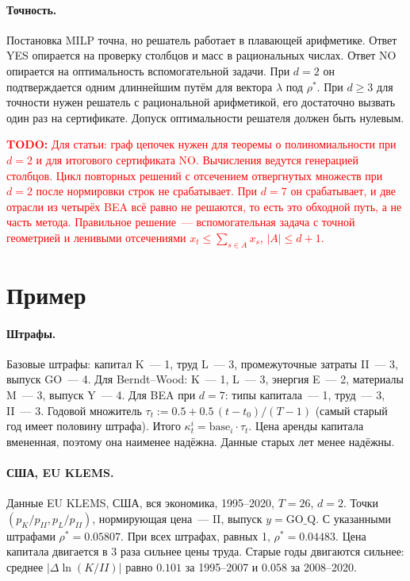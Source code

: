 \documentclass[a4paper,11pt]{article}
\theoremstyle{plain}
\theoremstyle{definition}
\theoremstyle{remark}
\newcommand{\abs}[1]{\left\lvert #1 \right\rvert}
\newcommand{\todo}[1]{\textcolor{red}{\textbf{TODO:} #1}}
\begin{document}
\paragraph{Точность.} Постановка MILP точна, но решатель работает в плавающей арифметике. Ответ YES опирается на проверку столбцов и масс в рациональных числах. Ответ NO опирается на оптимальность вспомогательной задачи. При $d=2$ он подтверждается одним длиннейшим путём для вектора $\lambda$ под $\rho^*$. При $d\ge3$ для точности нужен решатель с рациональной арифметикой, его достаточно вызвать один раз на сертификате. Допуск оптимальности решателя должен быть нулевым.

\todo{Для статьи: граф цепочек нужен для теоремы о полиномиальности при $d=2$ и для итогового сертификата NO. Вычисления ведутся генерацией столбцов. Цикл повторных решений с отсечением отвергнутых множеств при $d=2$ после нормировки строк не срабатывает. При $d=7$ он срабатывает, и две отрасли из четырёх BEA всё равно не решаются, то есть это обходной путь, а не часть метода. Правильное решение~--- вспомогательная задача с точной геометрией и ленивыми отсечениями $x_t\le\sum_{s\in A}x_s$, $\abs{A}\le d+1$.}


\section{Пример}

\paragraph{Штрафы.} Базовые штрафы: капитал K~--- 1, труд L~--- 3, промежуточные затраты II~--- 3, выпуск GO~--- 4. Для Berndt--Wood: K~--- 1, L~--- 3, энергия E~--- 2, материалы M~--- 3, выпуск Y~--- 4. Для BEA при $d=7$: типы капитала~--- 1, труд~--- 3, II~--- 3. Годовой множитель $\tau_t:=0.5+0.5\,(t-t_0)/(T-1)$ (самый старый год имеет половину штрафа). Итого $\kappa^i_t=\mathrm{base}_i\cdot\tau_t$. Цена аренды капитала вмененная, поэтому она наименее надёжна. Данные старых лет менее надёжны.

\paragraph{США, EU KLEMS.} Данные EU KLEMS, США, вся экономика, 1995--2020, $T=26$, $d=2$. Точки $(p_K/p_{II},p_L/p_{II})$, нормирующая цена~--- II, выпуск $y=\mathrm{GO\_Q}$. С указанными штрафами $\rho^*=0.05807$. При всех штрафах, равных 1, $\rho^*=0.04483$. Цена капитала двигается в 3 раза сильнее цены труда. Старые годы двигаются сильнее: среднее $\abs{\Delta\ln(K/II)}$ равно $0.101$ за 1995--2007 и $0.058$ за 2008--2020.
\end{document}
